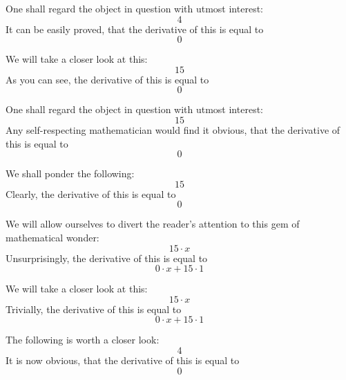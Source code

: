\documentclass{article}
\begin{document}
One shall regard the object in question with utmost interest:
\begin{equation}
4 
\end{equation}
It can be easily proved, that the derivative of this is equal to
\begin{equation}
0 
\end{equation}

We will take a closer look at this:
\begin{equation}
15 
\end{equation}
As you can see, the derivative of this is equal to
\begin{equation}
0 
\end{equation}

One shall regard the object in question with utmost interest:
\begin{equation}
15 
\end{equation}
Any self-respecting mathematician would find it obvious, that the derivative of this is equal to
\begin{equation}
0 
\end{equation}

We shall ponder the following:
\begin{equation}
15 
\end{equation}
Clearly, the derivative of this is equal to
\begin{equation}
0 
\end{equation}

We will allow ourselves to divert the reader's attention to this gem of mathematical wonder:
\begin{equation}
15 \cdot x 
\end{equation}
Unsurprisingly, the derivative of this is equal to
\begin{equation}
0 \cdot x + 15 \cdot 1 
\end{equation}

We will take a closer look at this:
\begin{equation}
15 \cdot x 
\end{equation}
Trivially, the derivative of this is equal to
\begin{equation}
0 \cdot x + 15 \cdot 1 
\end{equation}

The following is worth a closer look:
\begin{equation}
4 
\end{equation}
It is now obvious, that the derivative of this is equal to
\begin{equation}
0 
\end{equation}
\end{document}
